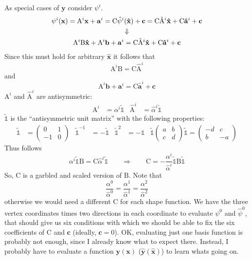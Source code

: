 \documentclass{scrartcl}
\begin{document}
As special cases of $\mathbf y$ consider $\psi^i$.
\begin{gather}
  \psi^i(\mathbf x)=\mathrm A^i\mathbf x+\mathbf a^i
  =\mathrm C\hat\psi^i(\mathbf{\hat x})+\mathbf c
  =\mathrm C\mathrm{\hat A}^i\mathbf{\hat x}
      +\mathrm C\mathbf{\hat a}^i+\mathbf c\\
  \Downarrow\notag\\
  \mathrm A^i\mathrm B\mathbf{\hat x}+\mathrm A^i\mathbf b
      +\mathbf a^i
  =\mathrm C\mathrm{\hat A}^i\mathbf{\hat x}
      +\mathrm C\mathbf{\hat a}^i+\mathbf c
\end{gather}
Since this must hold for arbitrary $\mathbf{\hat x}$ it follows that
\begin{equation}
    \mathrm A^i\mathrm B=\mathrm C\mathrm{\hat A}^i
\end{equation}
and
\begin{equation}
  \mathrm A^i\mathbf b+\mathbf a^i=\mathrm C\mathbf{\hat a}^i+\mathbf c
\end{equation}
$\mathrm A^i$ and $\mathrm{\hat A}^i$ are antisymmetric:
\begin{align}
  \mathrm A^i&=\alpha^i\mathds{\tilde1}
  &\mathrm{\hat A}^i&=\hat\alpha^i\mathds{\tilde1}
\end{align}
$\mathds{\tilde1}$ is the ``antisymmetric unit matrix'' with the following
properties:
\begin{align}
  \mathds{\tilde1}&=\begin{pmatrix}0&1\\-1&0\end{pmatrix} &
  \mathds{\tilde1}^{-1}&=-\mathds{\tilde1}                &
  \mathds{\tilde1}^2&=-\mathds1                           &
  \mathds{\tilde1}\begin{pmatrix}a&b\\c&d\end{pmatrix}\mathds{\tilde1}
      =\begin{pmatrix}-d&c\\b&-a\end{pmatrix}
\end{align}
Thus follows
\begin{equation}
  \alpha^i\mathds{\tilde1}\mathrm B=\mathrm C\hat\alpha^i\mathds{\tilde1}
  \qquad\Longrightarrow\qquad
  \mathrm C=-\frac{\alpha^i}{\hat\alpha^i}\mathds{\tilde1}\mathrm B\mathds{\tilde1}
\end{equation}
So, $\mathrm C$ is a garbled and scaled version of $\mathrm B$.  Note that
\begin{equation}
  \frac{\alpha^0}{\hat\alpha^0}
  =\frac{\alpha^1}{\hat\alpha^1}
  =\frac{\alpha^2}{\hat\alpha^2}
\end{equation}
otherwise we would need a different $\mathrm C$ for each shape function.
We
have the three vertex coordinates times two directions in each coordinate to
evaluate $\psi^0$ and $\hat\psi^0$, that should give us six conditions with
which we should be able to fix the six coefficients of $\mathrm C$ and
$\mathbf c$ (ideally, $\mathbf c=0$).  OK, evaluating just one basis function
is probably not enough, since I already know what to expect there.  Instead, I
probably have to evaluate a function $\mathbf y(\mathbf x)$ ($\mathbf{\hat
  y}(\mathbf{\hat x})$) to learn whats going on.
\end{document}
